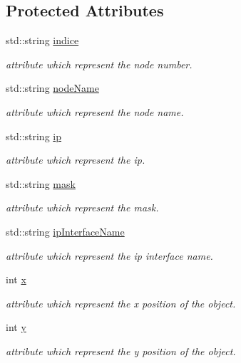 \subsection*{Protected Attributes}
\begin{CompactItemize}
\item 
std::string \hyperlink{class_equipement_d5124abeb4730c781cf45e7d538ebbc2}{indice}
\begin{CompactList}\small\item\em attribute which represent the node number. \item\end{CompactList}\item 
std::string \hyperlink{class_equipement_c83d966d9331f8b92ffa09b5eaf05816}{nodeName}
\begin{CompactList}\small\item\em attribute which represent the node name. \item\end{CompactList}\item 
std::string \hyperlink{class_equipement_0b1a1b3183ff2e26d5e86adcaa1a151d}{ip}
\begin{CompactList}\small\item\em attribute which represent the ip. \item\end{CompactList}\item 
std::string \hyperlink{class_equipement_bc9e4c10eacad003427f4812890c7d52}{mask}
\begin{CompactList}\small\item\em attribute which represent the mask. \item\end{CompactList}\item 
std::string \hyperlink{class_equipement_3e3703936280f99d55619e7b86810f3b}{ipInterfaceName}
\begin{CompactList}\small\item\em attribute which represent the ip interface name. \item\end{CompactList}\item 
int \hyperlink{class_equipement_45ae2acbe57b1a47e7e9eeed67738109}{x}
\begin{CompactList}\small\item\em attribute which represent the x position of the object. \item\end{CompactList}\item 
int \hyperlink{class_equipement_de92f12b5da5dde6f2b43921789cf676}{y}
\begin{CompactList}\small\item\em attribute which represent the y position of the object. \item\end{CompactList}\end{CompactItemize}


